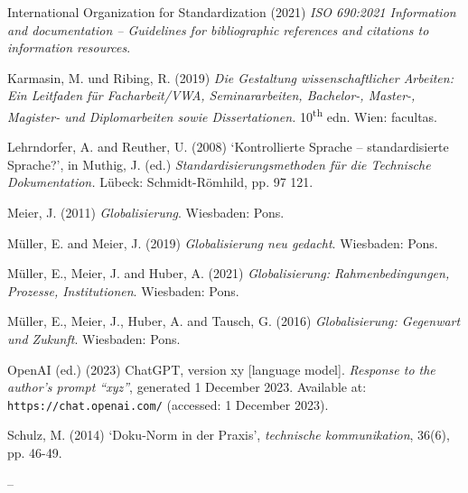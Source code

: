 \vspace{1mm}
International Organization for Standardization (2021) \textit{ISO 690:2021 Information and documentation – Guidelines for bibliographic references and citations to information resources}.

\vspace{1mm}
Karmasin, M. und Ribing, R. (2019) \textit{Die Gestaltung wissenschaftlicher Arbeiten: Ein Leitfaden für Facharbeit/VWA, Seminararbeiten, Bachelor-, Master-, Magister- und Diplomarbeiten sowie Dissertationen.}
10\textsuperscript{th} edn. Wien: facultas.

\vspace{1mm}
Lehrndorfer, A. and Reuther, U. (2008) ‘Kontrollierte Sprache – standardisierte Sprache?{’}, in Muthig, J. (ed.) \textit{Standardisierungsmethoden für die Technische Dokumentation.} Lübeck: Schmidt-Römhild, pp. 97 121.

\vspace{1mm}
Meier, J. (2011) \textit{Globalisierung}. Wiesbaden: Pons.

\vspace{1mm}
Müller, E. and Meier, J. (2019) \textit{Globalisierung neu gedacht}. Wiesbaden: Pons.

\vspace{1mm}
Müller, E., Meier, J. and Huber, A. (2021) \textit{Globalisierung: Rahmenbedingungen, Prozesse, Institutionen}. Wiesbaden: Pons.

\vspace{1mm}
Müller, E., Meier, J., Huber, A. and Tausch, G. (2016) \textit{Globalisierung: Gegenwart und Zukunft}. Wiesbaden: Pons.

\vspace{1mm}
OpenAI (ed.) (2023) ChatGPT, version xy [language model]. \textit{Response to the author’s prompt “xyz”}, generated 1 December 2023. Available at: \newline 
\texttt{https://chat.openai.com/} (accessed: 1 December 2023).

\vspace{1mm}
Schulz, M. (2014) ‘Doku-Norm in der Praxis’, \textit{technische kommunikation}, 36(6), pp. 46-49.

\vspace{1mm}
--

